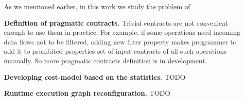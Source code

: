 As we mentioned earlier, in  this work we study the problem of 

\textbf{Definition of pragmatic contracts.}
Trivial contracts are not convenient enough to use them in practice.
For example, if some operations need incoming data flows not to be filtered, adding new filter property makes programmer to add it to prohibited properties set of input contracts of all such operations manually.
So more pragmatic contracts definition is in development.

\textbf{Developing cost-model based on the statistics.}
TODO

\textbf{Runtime execution graph reconfiguration.}
TODO











